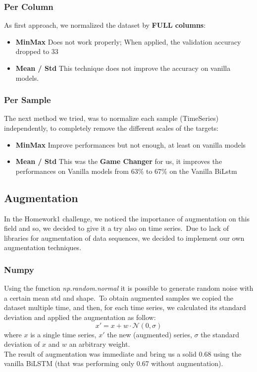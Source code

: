 \documentclass[11pt]{article}
\begin{document}
\subsubsection{Per Column}
As first approach, we normalized the dataset by \textbf{FULL columns}:
\begin{itemize}
  \item \textbf{MinMax} Does not work properly; When applied, the validation accuracy dropped to 33%
  \item \textbf{Mean / Std} This technique does not improve the accuracy on vanilla models.
\end{itemize}
\subsubsection{Per Sample}
The next method we tried, was to normalize each sample (TimeSeries) independently, to completely remove the different scales of the targets:
\begin{itemize}
  \item \textbf{MinMax} Improve performances but not enough, at least on vanilla models
  \item \textbf{Mean / Std} This was the \textbf{Game Changer} for us, it improves the performances on Vanilla models from 63\% to 67\% on the Vanilla BiLstm
\end{itemize}
\subsection{Augmentation}
In the Homework1 challenge, we noticed the importance of augmentation on this field and so, we decided to give it a try also on time series.\
Due to lack of libraries for augmentation of data sequences, we decided to implement our own augmentation techniques.

\subsubsection{Numpy}
Using the function \textit{np.random.normal} it is possible to generate random noise with a certain mean std and shape.\
To obtain augmented samples we copied the dataset multiple time, and then, for each time series, we calculated its standard deviation and applied the augmentation as follow:
\begin{equation*}
    x' = x + w\cdot\mathcal{N}(0, \sigma)
\end{equation*}
where $x$ is a single time series, $x'$ the new (augmented) series, $\sigma$ the standard deviation of $x$ and $w$ an arbitrary weight.\\
The result of augmentation was immediate and bring us a solid 0.68 using the vanilla BiLSTM (that was performing only 0.67 without augmentation).
\end{document}
